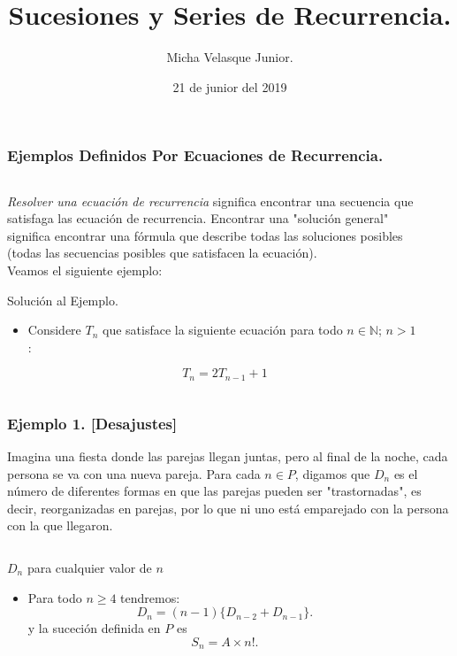 \documentclass[12pt]{beamer}
\author{Micha Velasque Junior.}
\title{Sucesiones y Series de Recurrencia.}
\institute{Universidad Nacional de Ingeniería.}
\date{21 de junior del 2019}
\begin{document}
\begin{frame}
\titlepage
\end{frame}

\begin{frame}
    \frametitle{Ejemplos Definidos Por Ecuaciones de Recurrencia.}
\begin{columns}
 \begin{column}{\textwidth}
\textit{Resolver una ecuación de recurrencia} significa encontrar una secuencia que satisfaga las ecuación de recurrencia. Encontrar una "solución general" significa encontrar una fórmula que describe todas las soluciones posibles (todas las secuencias posibles que satisfacen la ecuación).\\
Veamos el siguiente ejemplo:\\
\begin{block}{Solución al Ejemplo.}
\begin{itemize}[<+->]
\item Considere $T_{n}$ que satisface la siguiente ecuación para todo $n \in \mathbb{N}$; $n>1$ : 

$$T_{n} = 2T_{n-1} + 1 $$ 

\end{itemize}
\end{block}
 \end{column} \ \
\end{columns}
\end{frame}

\begin{frame}
\frametitle{Ejemplo 1. [Desajustes]}
Imagina una fiesta donde las parejas llegan juntas, pero al final de la noche, cada persona se va con una nueva pareja. Para cada $n \in P$, digamos que $D_{n}$ es el número de diferentes formas en que las parejas pueden ser "trastornadas", es decir, reorganizadas en parejas, por lo que ni uno está emparejado con la persona con la que llegaron.\\
\begin{columns}
 \begin{column}{\textwidth}
\begin{block}{$D_{n}$ para cualquier valor de $n$}
\begin{itemize}[<+->]
\item Para todo $n \geq 4$ tendremos:\\
$$D_{n} =(n-1)\{D_{n-2} + D_{n-1}\}.$$
y la suceción definida en $P$ es 
$$S_{n} = A \times n!.$$

\end{itemize}
\end{block}
 \end{column} \ \
\end{columns}
\end{frame}
\end{document}
